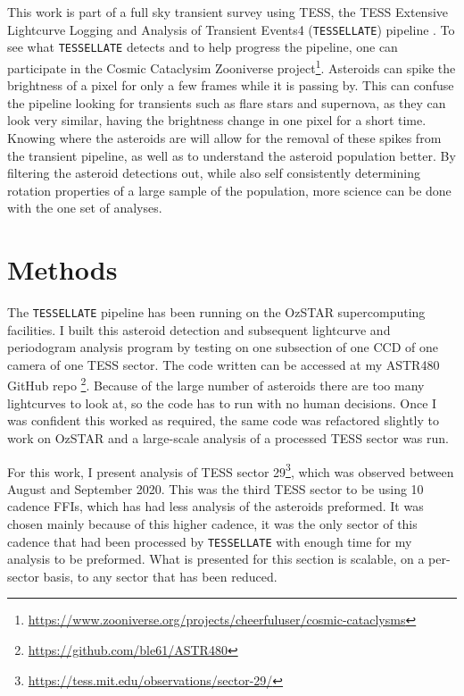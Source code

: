 \documentclass{UCreport}
\begin{document}
This work is part of a full sky transient survey using TESS, the TESS Extensive Lightcurve Logging and Analysis of Transient Events4 (\texttt{TESSELLATE}) pipeline \citep{TESSELLATE}.
To see what \texttt{TESSELLATE} detects and to help progress the pipeline, one can participate in the Cosmic Cataclysim Zooniverse project\footnote{\href{https://www.zooniverse.org/projects/cheerfuluser/cosmic-cataclysms}{https://www.zooniverse.org/projects/cheerfuluser/cosmic-cataclysms}}.
Asteroids can spike the brightness of a pixel for only a few frames while it is passing by.
This can confuse the pipeline looking for transients such as flare stars and supernova, as they can look very similar, having the brightness change in one pixel for a short time.
Knowing where the asteroids are will allow for the removal of these spikes from the transient pipeline, as well as to understand the asteroid population better.
By filtering the asteroid detections out, while also self consistently determining rotation properties of a large sample of the population, more science can be done with the one set of analyses.


\section{Methods}\label{Sec:Meth}

The \texttt{TESSELLATE} pipeline has been running on the OzSTAR supercomputing facilities.
I built this asteroid detection and subsequent lightcurve and periodogram analysis program by testing on one subsection of one CCD of one camera  of one TESS sector.
The code written can be accessed at my ASTR480 GitHub repo \footnote{\href{https://github.com/ble61/ASTR480}{https://github.com/ble61/ASTR480}}.
Because of the large number of asteroids there are too many lightcurves to look at, so the code has to run with no human decisions.
Once I was confident this worked as required, the same code was refactored slightly to work on OzSTAR and a large-scale analysis of a processed TESS sector was run.

For this work, I present analysis of TESS sector 29\footnote{\url{https://tess.mit.edu/observations/sector-29/}}, which was observed between  August and  September 2020.
This was the third TESS sector to be using \qty{10}{\min} cadence FFIs, which has had less analysis of the asteroids preformed.
It was chosen mainly because of this higher cadence, it was the only sector of this cadence that had been processed by \texttt{TESSELLATE} with enough time for my analysis to be preformed.
What is presented for this section is scalable, on a per-sector basis, to any sector that has been reduced.
\end{document}
